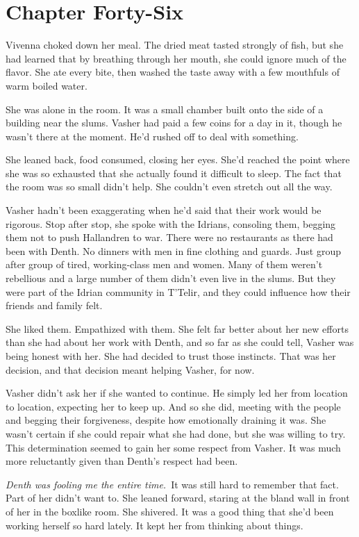 \section{Chapter Forty-Six}

Vivenna choked down her meal. The dried meat tasted strongly of fish, but she had learned that by breathing through her mouth, she could ignore much of the flavor. She ate every bite, then washed the taste away with a few mouthfuls of warm boiled water.

She was alone in the room. It was a small chamber built onto the side of a building near the slums. Vasher had paid a few coins for a day in it, though he wasn’t there at the moment. He’d rushed off to deal with something.

She leaned back, food consumed, closing her eyes. She’d reached the point where she was so exhausted that she actually found it difficult to sleep. The fact that the room was so small didn’t help. She couldn’t even stretch out all the way.

Vasher hadn’t been exaggerating when he’d said that their work would be rigorous. Stop after stop, she spoke with the Idrians, consoling them, begging them not to push Hallandren to war. There were no restaurants as there had been with Denth. No dinners with men in fine clothing and guards. Just group after group of tired, working-class men and women. Many of them weren’t rebellious and a large number of them didn’t even live in the slums. But they were part of the Idrian community in T’Telir, and they could influence how their friends and family felt.

She liked them. Empathized with them. She felt far better about her new efforts than she had about her work with Denth, and so far as she could tell, Vasher was being honest with her. She had decided to trust those instincts. That was her decision, and that decision meant helping Vasher, for now.

Vasher didn’t ask her if she wanted to continue. He simply led her from location to location, expecting her to keep up. And so she did, meeting with the people and begging their forgiveness, despite how emotionally draining it was. She wasn’t certain if she could repair what she had done, but she was willing to try. This determination seemed to gain her some respect from Vasher. It was much more reluctantly given than Denth’s respect had been.

\textit{Denth was fooling me the entire time.}~It was still hard to remember that fact. Part of her didn’t want to. She leaned forward, staring at the bland wall in front of her in the boxlike room. She shivered. It was a good thing that she’d been working herself so hard lately. It kept her from thinking about things.

